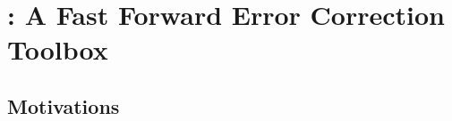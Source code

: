 
\section[\AFFECT]{\AFFECT: A Fast Forward Error Correction Toolbox}

\subsection[Motivations]{Motivations}


